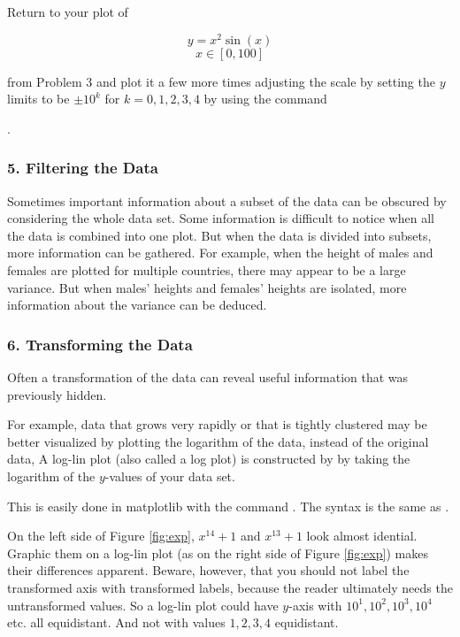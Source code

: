 \begin{problem}
Return to your plot of 

$$y = x^2\sin(x)$$ $$x\in[0,100]$$

from Problem 3 and plot it a few more times adjusting the scale by setting the $y$ limits to be $\pm10^{k}$ for $k = 0,1,2,3,4$ by using the command 

. 
\end{problem}



\subsubsection*{5. Filtering the Data}
Sometimes important information about a subset of the data can be obscured by considering the whole data set.  Some information is difficult to notice when all the data is combined into one plot.  But when the data is divided into subsets, more information can be gathered.  For example, when the height of males and females are plotted for multiple countries, there may appear to be a large variance.  But when males' heights and females' heights are isolated, more information about the variance can be deduced.

\subsubsection*{6. Transforming the Data}

Often a transformation of the data can reveal useful information that was previously hidden.

For example, data that grows very rapidly or that is tightly clustered may be better visualized by plotting the logarithm of the data, instead of the original data, A log-lin plot (also called a log plot) is constructed by by taking the logarithm of the $y$-values of your data set. 

This is easily done in matplotlib with the command .  The syntax is the same as .

On the left side of Figure \ref{fig:exp}, $x^{14}+1$ and $x^{13}+1$ look almost idential. Graphic them on a log-lin plot (as on the right side of Figure \ref{fig:exp}) makes their differences apparent.  Beware, however, that you should not label the transformed axis with transformed labels, because the reader ultimately needs the untransformed values.  So a log-lin plot could have $y$-axis with $10^{1},10^{2},10^{3},10^{4}$ etc.  all equidistant.  And not with values $1,2,3,4$ equidistant.

